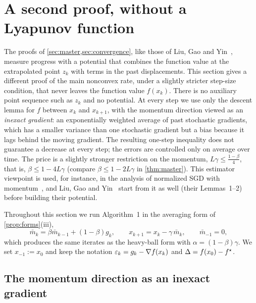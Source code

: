 \section{A second proof, without a Lyapunov function}\label{sec:lyapunov-free}

The proofs of \cref{sec:master,sec:convergence}, like those of Liu, Gao and
Yin~\cite{liu2020}, measure progress with a potential that combines the function value at
the extrapolated point $z_k$ with terms in the past displacements. This section gives a
different proof of the main nonconvex rate, under a slightly stricter step-size condition,
that never leaves the function value $f(x_k)$. There is no auxiliary point sequence such as
$z_k$ and no potential. At every step we use only the descent lemma for $f$ between $x_k$
and $x_{k+1}$, with the momentum direction viewed as an \emph{inexact gradient}: an
exponentially weighted average of past stochastic gradients, which has a smaller variance
than one stochastic gradient but a bias because it lags behind the moving gradient. The
resulting one-step inequality does not guarantee a decrease at every step; the errors are
controlled only on average over time. The price is a slightly stronger restriction on the
momentum, $L\gamma\le\frac{1-\beta}{4}$, that is, $\beta\le1-4L\gamma$ (compare
$\beta\le1-2L\gamma$ in \cref{thm:master}). This estimator viewpoint is used, for instance,
in the analysis of normalized SGD with momentum~\cite{cutkosky2020}, and Liu, Gao and
Yin~\cite{liu2020} start from it as well (their Lemmas~1--2) before building their potential.

Throughout this section we run Algorithm~1 in the averaging form of
\cref{prop:forms}(iii),
\begin{equation}\label{eq:ema-form}
  \bar m_k=\beta\bar m_{k-1}+(1-\beta)g_k,\qquad x_{k+1}=x_k-\gamma\,\bar m_k,\qquad \bar m_{-1}=0,
\end{equation}
which produces the same iterates as the heavy-ball form with $\alpha=(1-\beta)\gamma$. We set
$x_{-1}:=x_0$ and keep the notation $\varepsilon_k=g_k-\nabla f(x_k)$ and $\Delta=f(x_0)-f^\star$.

\subsection{The momentum direction as an inexact gradient}

